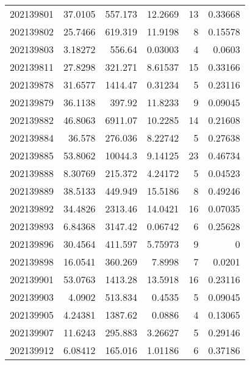 \begin{tabular}{rrrrrr}
 202139801 &         37.0105  &      557.173  &           12.2669  &          13 & 0.33668 \\
 202139802 &         25.7466  &      619.319  &           11.9198  &           8 & 0.15578 \\
 202139803 &          3.18272 &      556.64   &            0.03003 &           4 & 0.0603  \\
 202139811 &         27.8298  &      321.271  &            8.61537 &          15 & 0.33166 \\
 202139878 &         31.6577  &     1414.47   &            0.31234 &           5 & 0.23116 \\
 202139879 &         36.1138  &      397.92   &           11.8233  &           9 & 0.09045 \\
 202139882 &         46.8063  &     6911.07   &           10.2285  &          14 & 0.21608 \\
 202139884 &         36.578   &      276.036  &            8.22742 &           5 & 0.27638 \\
 202139885 &         53.8062  &    10044.3    &            9.14125 &          23 & 0.46734 \\
 202139888 &          8.30769 &      215.372  &            4.24172 &           5 & 0.04523 \\
 202139889 &         38.5133  &      449.949  &           15.5186  &           8 & 0.49246 \\
 202139892 &         34.4826  &     2313.46   &           14.0421  &          16 & 0.07035 \\
 202139893 &          6.84368 &     3147.42   &            0.06742 &           6 & 0.25628 \\
 202139896 &         30.4564  &      411.597  &            5.75973 &           9 & 0       \\
 202139898 &         16.0541  &      360.269  &            7.8998  &           7 & 0.0201  \\
 202139901 &         53.0763  &     1413.28   &           13.5918  &          16 & 0.23116 \\
 202139903 &          4.0902  &      513.834  &            0.4535  &           5 & 0.09045 \\
 202139905 &          4.24381 &     1387.62   &            0.0886  &           4 & 0.13065 \\
 202139907 &         11.6243  &      295.883  &            3.26627 &           5 & 0.29146 \\
 202139912 &          6.08412 &      165.016  &            1.01186 &           6 & 0.37186 \\

\end{tabular}

